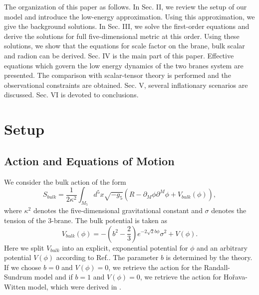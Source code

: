 \documentclass[a4paper,11pt]{article}
\begin{document}
The organization of this paper as follows. In Sec. II, we review the setup 
of our model and introduce the low-energy approximation. Using 
this approximation, we give the background solutions.  
In Sec. III, we solve the first-order equations and derive  
the solutions for full five-dimensional metric at this order.
Using these solutions, we show that 
the equations for scale factor on the brane, bulk scalar
and radion can be derived. 
Sec. IV is the main part of this paper. Effective equations 
which govern the low energy dynamics of the two branes system
are presented. The comparison with scalar-tensor theory 
is performed and the observational constraints are obtained.  
Sec. V, several inflationary scenarios are discussed.
Sec. VI is devoted to conclusions. 


\section{Setup}

\subsection{Action and Equations of Motion}

We consider the bulk action of the form
\begin{equation}
S_{bulk} = \frac{1}{2\kappa^2}\int_{M_5} d^5 x \sqrt{-g_5}
\left(R-\partial_M \phi \partial^M \phi + V_{bulk}(\phi) \right),
\end{equation} 
where $\kappa^2$ denotes the five-dimensional gravitational constant 
and $\sigma$ denotes the tension of the 3-brane.
The bulk potential is taken as 
\begin{equation}
V_{bulk}(\phi) = -\left(b^2 -\frac{2}{3}\right)
e^{-2\sqrt{2}b \phi} \sigma^2 +V(\phi). 
\end{equation} 
Here we split $V_{bulk}$ into an explicit, exponential potential 
for $\phi$ and an arbitrary potential $V(\phi)$ according to 
Ref.\cite{LOW}. 
The parameter $b$ is determined by the theory.  
If we choose $b=0$ and $V(\phi)=0$, we retrieve the 
action for the Randall-Sundrum model and if $b=1$ and $V(\phi)=0$, 
we retrieve the action for Ho\v{r}ava-Witten model, 
which were derived in \cite{Lukas1}.
\end{document}
